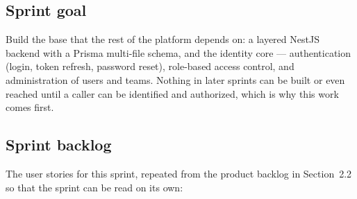 \subsection{Sprint goal}

Build the base that the rest of the platform depends on: a layered NestJS backend with a
Prisma multi-file schema, and the identity core --- authentication (login, token refresh,
password reset), role-based access control, and administration of users and teams. Nothing in
later sprints can be built or even reached until a caller can be identified and authorized,
which is why this work comes first.

\subsection{Sprint backlog}

The user stories for this sprint, repeated from the product backlog in Section~2.2 so that the
sprint can be read on its own:

